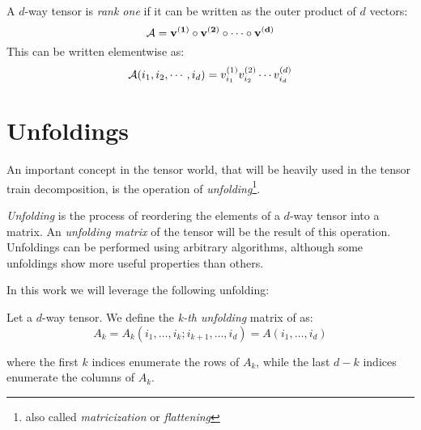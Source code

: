 
\begin{Def}
  A $d$-way tensor \A is \emph{rank one} if it can be written as the outer product of $d$ vectors:
  \[
  \mathcal{A} = \mathbf{v^{(1)}} \circ \mathbf{v^{(2)}} \circ \cdots \circ \mathbf{v^{(d)}}
  \]
  This can be written elementwise as:
  \[
  \mathcal{A}(i_1,i_2,\cdots,i_d) = v_{i_1}^{(1)} v_{i_2}^{(2)} \cdots v_{i_d}^{(d)}
  \]
\end{Def}

\section{Unfoldings}
An important concept in the tensor world, that will be heavily used in the tensor train decomposition, is the operation of \emph{unfolding}\footnote{also called \emph{matricization} or \emph{flattening}}.

\emph{Unfolding} is the process of reordering the elements of a $d$-way tensor into a matrix. An \emph{unfolding matrix} of the tensor will be the result of this operation. Unfoldings can be performed using arbitrary algorithms, although some unfoldings show more useful properties than others.

In this work we will leverage the following unfolding:

\begin{Def}
  Let \A a $d$-way tensor. We define the \emph{k-th unfolding} matrix of \A as:
  \begin{equation} \label{def:unfolding}
    A_k = A_k(i_1,\dots,i_k;i_{k+1},\dots,i_d) = A(i_1,\dots,i_d)
  \end{equation}

where the first $k$ indices enumerate the rows of $A_k$, while the last $d - k$ indices enumerate the columns of $A_k$.
\end{Def}

